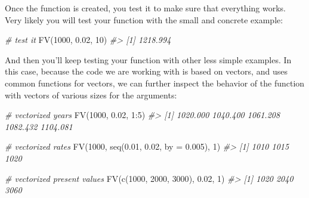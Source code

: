 \documentclass[
]{book}
\newenvironment{Shaded}{\begin{snugshade}}{\end{snugshade}}
\newcommand{\AttributeTok}[1]{\textcolor[rgb]{0.77,0.63,0.00}{#1}}
\newcommand{\CommentTok}[1]{\textcolor[rgb]{0.56,0.35,0.01}{\textit{#1}}}
\newcommand{\DecValTok}[1]{\textcolor[rgb]{0.00,0.00,0.81}{#1}}
\newcommand{\FloatTok}[1]{\textcolor[rgb]{0.00,0.00,0.81}{#1}}
\newcommand{\FunctionTok}[1]{\textcolor[rgb]{0.00,0.00,0.00}{#1}}
\newcommand{\NormalTok}[1]{#1}
\newcommand{\SpecialCharTok}[1]{\textcolor[rgb]{0.00,0.00,0.00}{#1}}
\begin{document}
Once the function is created, you test it to make sure that everything works.
Very likely you will test your function with the small and concrete example:

\begin{Shaded}
\begin{Highlighting}[]
\CommentTok{\# test it}
\FunctionTok{FV}\NormalTok{(}\DecValTok{1000}\NormalTok{, }\FloatTok{0.02}\NormalTok{, }\DecValTok{10}\NormalTok{)}
\CommentTok{\#\textgreater{} [1] 1218.994}
\end{Highlighting}
\end{Shaded}

And then you'll keep testing your function with other less simple examples.
In this case, because the code we are working with is based on vectors,
and uses common functions for vectors, we can further inspect the behavior of
the function with vectors of various sizes for the arguments:

\begin{Shaded}
\begin{Highlighting}[]
\CommentTok{\# vectorized years}
\FunctionTok{FV}\NormalTok{(}\DecValTok{1000}\NormalTok{, }\FloatTok{0.02}\NormalTok{, }\DecValTok{1}\SpecialCharTok{:}\DecValTok{5}\NormalTok{)}
\CommentTok{\#\textgreater{} [1] 1020.000 1040.400 1061.208 1082.432 1104.081}
\end{Highlighting}
\end{Shaded}

\begin{Shaded}
\begin{Highlighting}[]
\CommentTok{\# vectorized rates}
\FunctionTok{FV}\NormalTok{(}\DecValTok{1000}\NormalTok{, }\FunctionTok{seq}\NormalTok{(}\FloatTok{0.01}\NormalTok{, }\FloatTok{0.02}\NormalTok{, }\AttributeTok{by =} \FloatTok{0.005}\NormalTok{), }\DecValTok{1}\NormalTok{)}
\CommentTok{\#\textgreater{} [1] 1010 1015 1020}
\end{Highlighting}
\end{Shaded}

\begin{Shaded}
\begin{Highlighting}[]
\CommentTok{\# vectorized present values}
\FunctionTok{FV}\NormalTok{(}\FunctionTok{c}\NormalTok{(}\DecValTok{1000}\NormalTok{, }\DecValTok{2000}\NormalTok{, }\DecValTok{3000}\NormalTok{), }\FloatTok{0.02}\NormalTok{, }\DecValTok{1}\NormalTok{)}
\CommentTok{\#\textgreater{} [1] 1020 2040 3060}
\end{Highlighting}
\end{Shaded}
\end{document}
